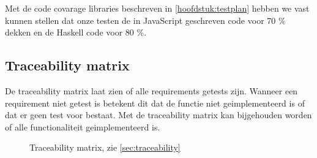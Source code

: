 Met de code covarage libraries beschreven in \autoref{hoofdstuk:testplan} hebben we vast kunnen stellen dat onze testen de in JavaScript geschreven code voor 70 \% dekken en de Haskell code voor 80 \%.  


\subsection{Traceability matrix} \label{sec:traceability}
De traceability matrix laat zien of alle requirements getests zijn. Wanneer een requirement niet getest is betekent dit dat de functie niet geimplementeerd is of dat er geen test voor bestaat. Met de traceability matrix kan bijgehouden worden of alle functionaliteit geimplementeerd is.

\begin{figure}
\begin{center}
\resizebox{\linewidth}{!}{}
\caption{Traceability matrix, zie \autoref{sec:traceability}}
\label{fig:traceability}
\end{center}
\end{figure}





